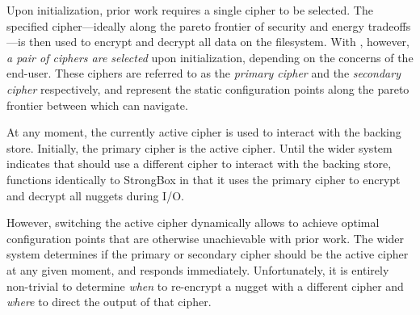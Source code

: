 Upon initialization, prior work requires a single cipher to be selected. The
specified cipher---ideally along the pareto frontier of security and energy
tradeoffs---is then used to encrypt and decrypt all data on the filesystem. With
\SYSTEM{}, however, \emph{a pair of ciphers are selected} upon initialization,
depending on the concerns of the end-user. These ciphers are referred to as the
\emph{primary cipher} and the \emph{secondary cipher} respectively, and
represent the static configuration points along the pareto frontier between
which \SYSTEM{} can navigate. 

At any moment, the currently active cipher is used to interact with the backing
store. Initially, the primary cipher is the active cipher. Until the wider
system indicates that \SYSTEM{} should use a different cipher to interact with
the backing store, \SYSTEM{} functions identically to StrongBox in that it uses
the primary cipher to encrypt and decrypt all nuggets during I/O.

However, switching the active cipher dynamically allows \SYSTEM{} to achieve
optimal configuration points that are otherwise unachievable with prior work.
The wider system determines if the primary or secondary cipher should be the
active cipher at any given moment, and \SYSTEM{} responds immediately.
Unfortunately, it is entirely non-trivial to determine \emph{when} to re-encrypt
a nugget with a different cipher and \emph{where} to direct the output of that
cipher. 

